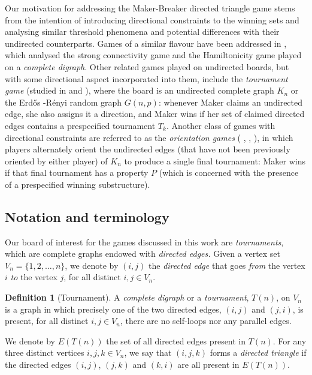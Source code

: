 \documentclass{article}
\theoremstyle{definition}
\newtheorem{defi}{Definition}[section]
\theoremstyle{plain}
\theoremstyle{remark}
\theoremstyle{definition}
\begin{document}
Our motivation for addressing the Maker-Breaker directed triangle game stems from the intention of introducing directional constraints to the winning sets and analysing similar threshold phenomena and potential differences with their undirected counterparts.
Games of a similar flavour have been addressed in  \cite{frieze2021maker}, which analysed the strong connectivity game and the Hamiltonicity game played on a \emph{complete digraph}.
Other related games played on undirected boards, but with some directional aspect incorporated into them, include the \emph{tournament game} (studied in \cite{clemens2016random} and  \cite{clemens2015remark}), where the board is an undirected complete graph $K_n$ or the Erd\H{o}s -R\'{e}nyi random graph  $G(n,p)$: whenever Maker claims an undirected edge, she also assigns it a direction, and Maker wins if her set of claimed directed edges contains a prespecified tournament $T_k$. Another class of games with directional constraints are referred to as the \emph{orientation games} ( \cite{bollobas1998oriented},  \cite{ben2012biased},  \cite{clemens2017non}), in which players alternately orient the undirected edges (that have not been previously oriented by either player) of $K_n$ to produce a single final tournament: Maker wins if that final tournament has a property $P$ (which is concerned with the presence of a prespecified winning substructure).


\subsection{Notation and terminology}\label{Subsection:Notation}

Our board of interest for the games discussed in this work are \emph{tournaments}, which are complete graphs endowed with \emph{directed edges.} Given a vertex set $V_{n}=\{1,2,\ldots,n\}$, we denote by $(i,j)$ the \emph{directed edge} that goes \emph{from} the vertex $i$ \emph{to} the vertex $j$, for all distinct $i,j \in V_{n}$. 

\begin{defi}[Tournament]\label{defi:Tournament}
     A \emph{complete digraph} or a \emph{tournament}, $T(n)$, on $V_{n}$ is a graph in which precisely one of the two directed edges, $(i,j)$ and $(j,i)$, is present, for all distinct $i,j \in V_{n}$, there are no self-loops nor any parallel edges.
\end{defi}

We denote by $E(T(n))$ the set of all directed edges present in $T(n)$. For any three distinct vertices $i, j, k \in V_{n}$, we say that $(i,j,k)$ forms a \emph{directed triangle} if the directed edges $(i,j)$, $(j,k)$ and $(k,i)$ are all present in $E(T(n))$.
\end{document}
